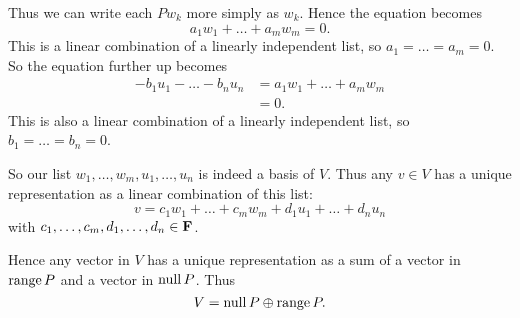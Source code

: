 \documentclass[a5paper]{article}
\begin{document}
    Thus we can write each $Pw_k$ more simply as $w_k$.
    Hence the equation becomes
\begin{equation*}
        a_1w_1 + \dots + a_mw_m = 0 .
\end{equation*}
    This is a linear combination of a linearly independent list, so $a_1 = \dots = a_m = 0$.
    So the equation further up becomes
\begin{align*}
        -b_1u_1 - \dots - b_nu_n &= a_1w_1 + \dots + a_mw_m \\
                                 &= 0 .
\end{align*}
    This is also a linear combination of a linearly independent list, so $b_1 = \dots = b_n = 0$.

    So our list $w_1,\dots,w_m,u_1,\dots,u_n$ is indeed a basis of $V$.
    Thus any $v \in V$ has a unique representation as a linear combination of this list:
\begin{equation*}
        v = c_1w_1 + \dots + c_mw_m + d_1u_1 + \dots + d_nu_n
\end{equation*}
    with $c_1,\dots,c_m,d_1,\dots,d_n \in \mathbf{F}$.

    Hence any vector in $V$ has a unique representation as a sum of a vector in $\operatorname{range}P$ and a vector in $\operatorname{null}P$.
    Thus
\begin{equation*}
        V = \operatorname{null}P \oplus \operatorname{range}P .
\end{equation*}
\end{document}
